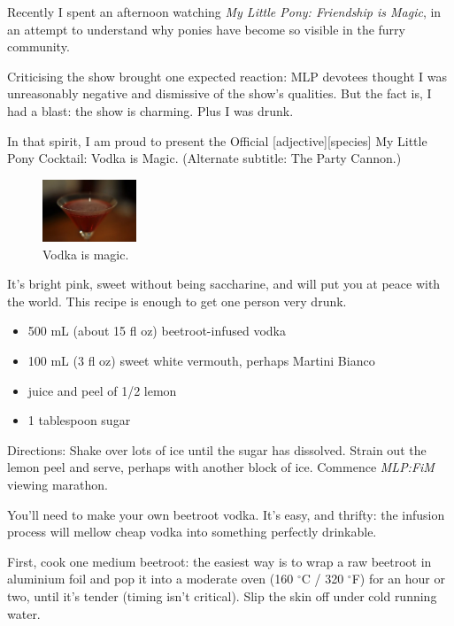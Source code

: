 
Recently I spent an afternoon watching \textit{My Little Pony: Friendship is Magic}, in an attempt to understand why ponies have become so visible in the furry community.

Criticising the show brought one expected reaction: MLP devotees thought I was unreasonably negative and dismissive of the show’s qualities. But the fact is, I had a blast: the show is charming. Plus I was drunk.

In that spirit, I am proud to present the Official [adjective][species] My Little Pony Cocktail: Vodka is Magic. (Alternate subtitle: The Party Cannon.)

\begin{figure}
  \begin{center}
    \includegraphics[width=0.25\textwidth]{content/assets/mlp--drink}
  \end{center}
  \caption{Vodka is magic.}
\end{figure}

It’s bright pink, sweet without being saccharine, and will put you at peace with the world. This recipe is enough to get one person very drunk.

\begin{itemize}
  \item 500 mL (about 15 fl oz) beetroot-infused vodka
  \item 100 mL (3 fl oz) sweet white vermouth, perhaps Martini Bianco
  \item juice and peel of 1/2 lemon
  \item 1 tablespoon sugar
\end{itemize}

Directions: Shake over lots of ice until the sugar has dissolved. Strain out the lemon peel and serve, perhaps with another block of ice. Commence \textit{MLP:FiM} viewing marathon.

\secdiv

You’ll need to make your own beetroot vodka. It’s easy, and thrifty: the infusion process will mellow cheap vodka into something perfectly drinkable.

First, cook one medium beetroot: the easiest way is to wrap a raw beetroot in aluminium foil and pop it into a moderate oven (160 $^{\circ}$C / 320 $^{\circ}$F) for an hour or two, until it’s tender (timing isn’t critical). Slip the skin off under cold running water.

